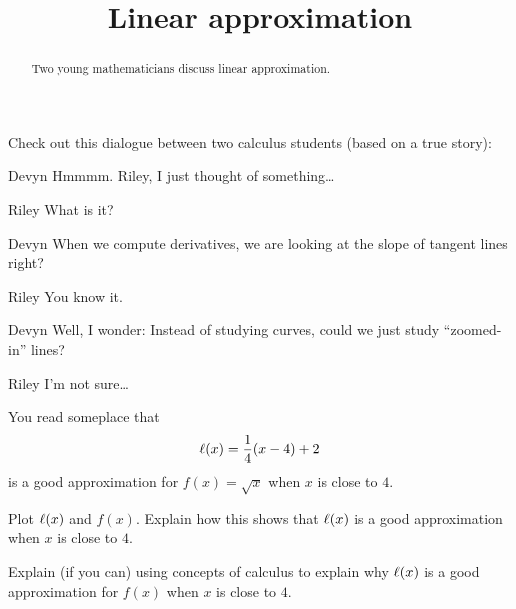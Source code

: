 \documentclass{ximera}
\title[Break-Ground:]{Linear approximation}
\begin{document}
\begin{abstract}
Two young mathematicians discuss linear approximation.
\end{abstract}
\maketitle

Check out this dialogue between two calculus students (based on a true
story):



\begin{dialogue}
\item[Devyn] Hmmmm. Riley, I just thought of something\dots
\item[Riley] What is it?
\item[Devyn] When we compute derivatives, we are looking at the slope
  of tangent lines right?
\item[Riley] You know it.
\item[Devyn] Well, I wonder: Instead of studying curves, could we just
  study ``zoomed-in'' lines?
\item[Riley] I'm not sure\dots
\end{dialogue}


You read someplace that
\[
\ell(x) = \frac{1}{4}(x-4)+2
\]
is a good approximation for $f(x) = \sqrt{x}$ when $x$ is close to
$4$.

\begin{problem}
  Plot $\ell(x)$ and $f(x)$. Explain how this shows that $\ell(x)$ is a
  good approximation when $x$ is close to $4$.
  \begin{prompt}
  \begin{freeResponse}
  \end{freeResponse}
  \end{prompt}
\end{problem}

\begin{problem}
 Explain (if you can) using concepts of calculus to explain why
 $\ell(x)$ is a good approximation for $f(x)$ when $x$ is close to $4$.
 \begin{prompt}
  \begin{freeResponse}
  \end{freeResponse}
 \end{prompt}
\end{problem}





\end{document}
